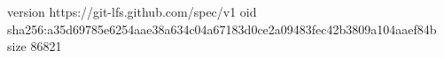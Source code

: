 version https://git-lfs.github.com/spec/v1
oid sha256:a35d69785e6254aae38a634c04a67183d0ce2a09483fec42b3809a104aaef84b
size 86821
